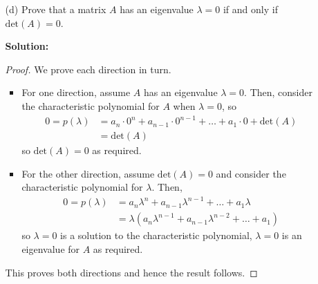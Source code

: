 \documentclass[letterpaper,12pt]{article}
\theoremstyle{definition}
\begin{document}
\begin{itemize}
    \item[] \begin{enumerate}
        \item[(d)] Prove that a matrix $A$ has an eigenvalue $\lambda = 0$ if and only if $\mathrm{det}(A) = 0$.
        \begin{mdframed}
            \textbf{Solution:}
            \begin{proof}
        We prove each direction in turn. \begin{itemize}
            \item For one direction, assume $A$ has an eigenvalue $\lambda = 0$. Then, consider the characteristic polynomial for $A$ when $\lambda = 0$, so \begin{align*}
                0 = p(\lambda) &= a_n \cdot 0^n + a_{n-1} \cdot 0^{n-1} + \ldots + a_1 \cdot 0 + \mathrm{det}(A) \\
                &= \mathrm{det}(A)
            \end{align*}
            so  $\mathrm{det}(A) = 0$ as required.
            \item  For the other direction, assume $\mathrm{det}(A) = 0$ and consider the characteristic polynomial for $\lambda$. Then, \begin{align*}
                0 = p(\lambda) &= a_n\lambda^n + a_{n-1}\lambda^{n-1} + \ldots + a_1 \lambda \\
                &= \lambda (a_n\lambda^{n-1} + a_{n-1}\lambda^{n-2} + \ldots + a_1 )
            \end{align*}
            so $\lambda = 0$ is a solution to the characteristic polynomial, $\lambda = 0$ is an eigenvalue for $A$ as required.
        \end{itemize}
          This proves both directions and hence the result follows.
        \end{proof}
        \end{mdframed}
    \end{enumerate}
\end{itemize}
\pagebreak
\end{document}
